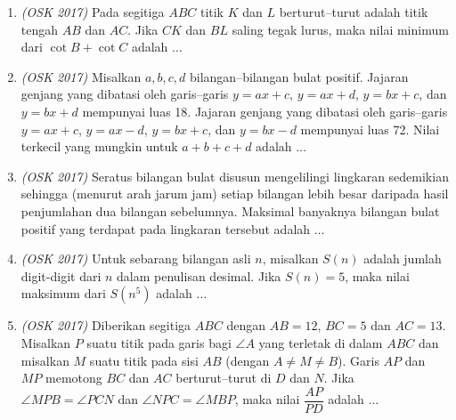 \begin{enumerate}
	\item \textit{(OSK 2017)} Pada segitiga $ABC$ titik $K$ dan $L$ berturut–turut adalah titik tengah $AB$ dan $AC$. Jika $CK$ dan $BL$ saling tegak lurus, maka nilai minimum dari $\cot B + \cot C$ adalah $\dots$
	
	\item \textit{(OSK 2017)} Misalkan $a,b,c,d$ bilangan–bilangan bulat positif. Jajaran genjang yang dibatasi oleh garis–garis $y=ax+c$, $y=ax+d$, $y=bx+c$, dan $y=bx+d$ mempunyai luas 18. Jajaran genjang yang dibatasi oleh garis–garis $y=ax+c$, $y=ax-d$, $y=bx+c$, dan $y=bx-d$ mempunyai luas 72. Nilai terkecil yang mungkin untuk $a+b+c+d$ adalah $\dots$
	
	\item \textit{(OSK 2017)} Seratus bilangan bulat disusun mengelilingi lingkaran sedemikian sehingga (menurut arah jarum jam) setiap bilangan lebih besar daripada hasil penjumlahan dua bilangan sebelumnya. Maksimal banyaknya bilangan bulat positif yang terdapat pada lingkaran tersebut adalah $\dots$
	
	\item \textit{(OSK 2017)} Untuk sebarang bilangan asli $n$, misalkan $S(n)$ adalah jumlah digit-digit dari $n$ dalam penulisan desimal. Jika $S(n) = 5$, maka nilai maksimum dari $S(n^5)$ adalah $\dots$
	
	\item \textit{(OSK 2017)} Diberikan segitiga $ABC$ dengan $AB = 12$, $BC = 5$ dan $AC = 13$. Misalkan $P$ suatu titik pada garis bagi $\angle A$ yang terletak di dalam $ABC$ dan misalkan $M$ suatu titik pada sisi $AB$ (dengan $A \ne M \ne B$). Garis $AP$ dan $MP$ memotong $BC$ dan $AC$ berturut–turut di $D$ dan $N$. Jika $\angle MPB = \angle PCN$ dan $\angle NPC = \angle MBP$, maka nilai $\dfrac{AP}{PD}$ adalah $\dots$
	
\end{enumerate}
\newpage

